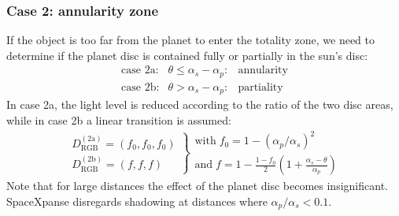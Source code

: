 \documentclass[a4paper]{article}
\begin{document}
\subsubsection{Case 2: annularity zone}\label{sec:noatm_annul}
If the object is too far from the planet to enter the totality zone, we need to determine if the planet disc is contained fully or partially in the sun's disc:
\begin{equation}
\begin{array}{lcl}
\text{case 2a:} & \theta \leq \alpha_s-\alpha_p: & \text{annularity}\\
\text{case 2b:} & \theta > \alpha_s-\alpha_p: & \text{partiality}
\end{array}
\end{equation}
In case 2a, the light level is reduced according to the ratio of the two disc areas, while in case 2b a linear transition is assumed:
\begin{equation}
\left.
\begin{array}{l}
D_\text{RGB}^{(\text{2a})} = (f_0,f_0,f_0)\\
D_\text{RGB}^{(\text{2b})} = (f,f,f)
\end{array}
\right\rbrace
\begin{array}{l}
\text{with}\; f_0 = 1-(\alpha_p/\alpha_s)^2\\
\text{and}\; f = 1-\frac{1-f_0}{2} (1+\frac{\alpha_s-\theta}{\alpha_p})
\end{array}
\end{equation}
Note that for large distances the effect of the planet disc becomes insignificant. SpaceXpanse disregards shadowing at distances where $\alpha_p/\alpha_s < 0.1$.
\end{document}

